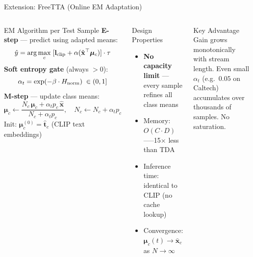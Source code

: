 \documentclass[aspectratio=169,11pt]{beamer}
\newcommand{\mub}{\boldsymbol{\mu}}
\begin{document}
\begin{frame}{Extension: FreeTTA (Online EM Adaptation)}
\begin{columns}[T]
  \begin{block}{EM Algorithm per Test Sample}
    \footnotesize
    \textbf{E-step} — predict using adapted means:
    \[\hat{y} = \arg\max_c\;[\mathbf{l}_{\rm clip} + \alpha(\hat{\mathbf{x}}^\top\mub_c)]\cdot\tau\]
    \textbf{Soft entropy gate} (always $>0$):
    \[\alpha_t = \exp(-\beta\cdot H_{\rm norm})\;\in(0,1]\]
    \textbf{M-step} — update class means:
    \[\mub_c \leftarrow \frac{N_c\,\mub_c + \alpha_t p_c\,\hat{\mathbf{x}}}{N_c + \alpha_t p_c},\quad N_c \leftarrow N_c + \alpha_t p_c\]
    Init: $\mub_c^{(0)} = \hat{\mathbf{t}}_c$ (CLIP text embeddings)
  \end{block}
  \begin{exampleblock}{Design Properties}
    \begin{itemize}\footnotesize\setlength{\itemsep}{2pt}
      \item \textbf{No capacity limit} — every sample refines all class means
      \item Memory: $O(C{\cdot}D)$\;—--15$\times$ less than TDA
      \item Inference time: identical to CLIP (no cache lookup)
      \item Convergence: $\mub_c(t)\to\bar{\mathbf{x}}_c$ as $N\to\infty$
    \end{itemize}
  \end{exampleblock}
  \begin{alertblock}{\footnotesize Key Advantage}
    \footnotesize Gain grows monotonically with stream length. Even small $\alpha_t$ (e.g.\ $0.05$ on Caltech) accumulates over thousands of samples. No saturation.
  \end{alertblock}
\end{columns}
\end{frame}
\end{document}
